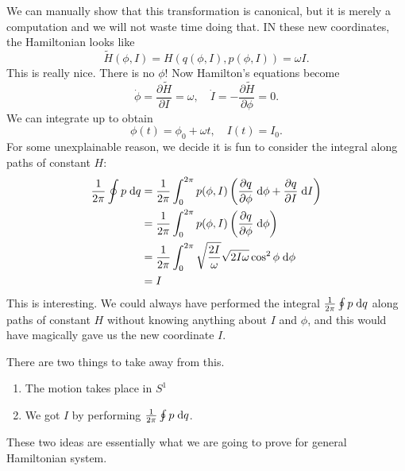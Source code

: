 \documentclass[a4paper]{article}
\begin{document}
\begin{eg}
  We can manually show that this transformation is canonical, but it is merely a computation and we will not waste time doing that. IN these new coordinates, the Hamiltonian looks like
  \[
    \tilde{H}(\phi, I) = H(q(\phi, I), p(\phi, I)) = \omega I.
  \]
  This is really nice. There is no $\phi$! Now Hamilton's equations become
  \[
    \dot\phi = \frac{\partial \tilde{H}}{ \partial I} = \omega,\quad \dot{I} = -\frac{\partial \tilde{H}}{\partial \phi} = 0.
  \]
  We can integrate up to obtain
  \[
    \phi(t) = \phi_0 + \omega t,\quad I(t) = I_0.
  \]
  For some unexplainable reason, we decide it is fun to consider the integral along paths of constant $H$:
  \begin{align*}
    \frac{1}{2\pi}\oint p \;\mathrm{d} q &= \frac{1}{2\pi} \int_0^{2\pi}p(\phi, I) \left(\frac{\partial q}{\partial \phi} \;\mathrm{d} \phi + \frac{\partial q}{\partial I} \;\mathrm{d} I\right)\\
    &= \frac{1}{2\pi} \int_0^{2\pi}p(\phi, I) \left(\frac{\partial q}{\partial \phi} \;\mathrm{d} \phi\right)\\
    &= \frac{1}{2\pi} \int_0^{2\pi} \sqrt{\frac{2I}{\omega}}\sqrt{2I\omega} \cos^2 \phi \;\mathrm{d} \phi\\
    &= I
  \end{align*}
  This is interesting. We could always have performed the integral $\frac{1}{2\pi} \oint p \;\mathrm{d} q$ along paths of constant $H$ without knowing anything about $I$ and $\phi$, and this would have magically gave us the new coordinate $I$.
\end{eg}

There are two things to take away from this.
\begin{enumerate}
  \item The motion takes place in $S^1$
  \item We got $I$ by performing $\frac{1}{2\pi}\oint p \;\mathrm{d} q$.
\end{enumerate}
These two ideas are essentially what we are going to prove for general Hamiltonian system.
\end{document}
